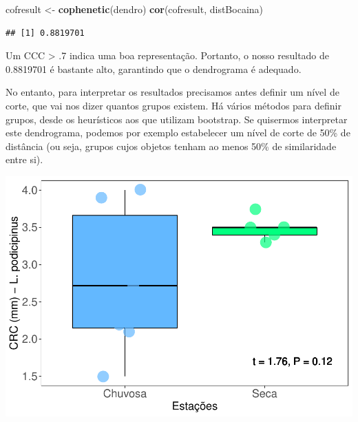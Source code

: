 \documentclass[
]{book}
\newenvironment{Shaded}{\begin{snugshade}}{\end{snugshade}}
\newcommand{\DataTypeTok}[1]{\textcolor[rgb]{0.13,0.29,0.53}{#1}}
\newcommand{\DecValTok}[1]{\textcolor[rgb]{0.00,0.00,0.81}{#1}}
\newcommand{\KeywordTok}[1]{\textcolor[rgb]{0.13,0.29,0.53}{\textbf{#1}}}
\newcommand{\NormalTok}[1]{#1}
\newcommand{\OperatorTok}[1]{\textcolor[rgb]{0.81,0.36,0.00}{\textbf{#1}}}
\newcommand{\StringTok}[1]{\textcolor[rgb]{0.31,0.60,0.02}{#1}}
\begin{document}
\begin{Shaded}
\begin{Highlighting}[]
\NormalTok{cofresult <-}\StringTok{ }\KeywordTok{cophenetic}\NormalTok{(dendro)}
\KeywordTok{cor}\NormalTok{(cofresult, distBocaina)}
\end{Highlighting}
\end{Shaded}

\begin{verbatim}
## [1] 0.8819701
\end{verbatim}

Um CCC \textgreater{} .7 indica uma boa representação. Portanto, o nosso resultado de 0.8819701 é bastante alto, garantindo que o dendrograma é adequado.

No entanto, para interpretar os resultados precisamos antes definir um nível de corte, que vai nos dizer quantos grupos existem. Há vários métodos para definir grupos, desde os heurísticos aos que utilizam bootstrap. Se quisermos interpretar este dendrograma, podemos por exemplo estabelecer um nível de corte de 50\% de distância (ou seja, grupos cujos objetos tenham ao menos 50\% de similaridade entre si).

\begin{Shaded}
\end{Shaded}

\includegraphics{livro_r_ecologia_files/figure-latex/unnamed-chunk-4-1.pdf}
\end{document}
